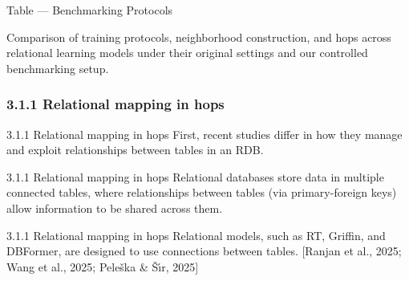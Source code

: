 \documentclass[aspectratio=169,10pt]{beamer}
\newcommand{\cit}[1]{{\scriptsize\color{gray}[#1]}}
\begin{document}
\begin{frame}{Table --- Benchmarking Protocols}
\centering
{}

\footnotesize
Comparison of training protocols, neighborhood construction, and hops across relational learning models under their original settings and our controlled benchmarking setup.
\end{frame}

\subsubsection{3.1.1 Relational mapping in hops}

\begin{frame}{3.1.1 Relational mapping in hops}
First, recent studies differ in how they manage and exploit relationships between tables in an RDB.
\end{frame}

\begin{frame}{3.1.1 Relational mapping in hops}
Relational databases store data in multiple connected tables, where relationships between tables (via primary-foreign keys) allow information to be shared across them.
\end{frame}

\begin{frame}{3.1.1 Relational mapping in hops}
Relational models, such as RT, Griffin, and DBFormer, are designed to use connections between tables.
\cit{Ranjan et al., 2025; Wang et al., 2025; Pele\v{s}ka \& \v{S}\'{\i}r, 2025}
\end{frame}
\end{document}
